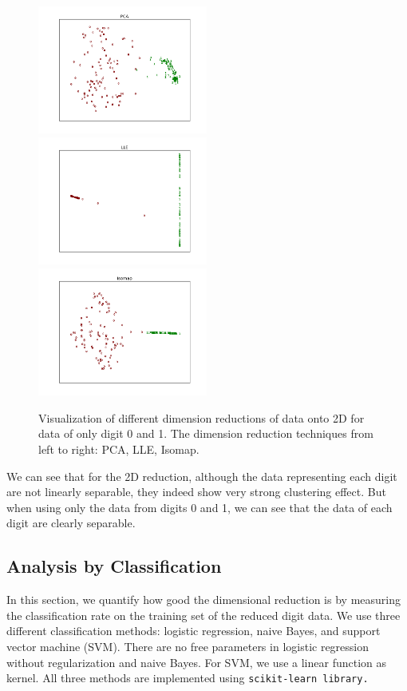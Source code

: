 \documentclass[11pt]{article}
\begin{document}
\begin{figure}[H]
\begin{center}
\includegraphics[width=2.2in]{pca2digit.png}
\includegraphics[width=2.2in]{lle2digit.png}
\includegraphics[width=2.2in]{isomap2digit.png}
\end{center}
\caption{Visualization of different dimension reductions of data onto 2D for data of only digit 0 and 1. The dimension reduction techniques from left to right: PCA, LLE, Isomap.}
\label{reduce_2_digits}
\end{figure}

We can see that for the 2D reduction, although the data representing each digit are not linearly separable, they indeed show very strong clustering effect. But when using only the data from digits 0 and 1, we can see that the data of each digit are clearly separable.

\subsection*{Analysis by Classification}
In this section, we quantify how good the dimensional reduction is by measuring the classification rate on the training set of the reduced digit data. We use three different classification methods: logistic regression, naive Bayes, and support vector machine (SVM). There are no free parameters in logistic regression without regularization and naive Bayes. For SVM, we use a linear function as kernel. All three methods are implemented using \tt scikit-learn \rm library.
\end{document}
